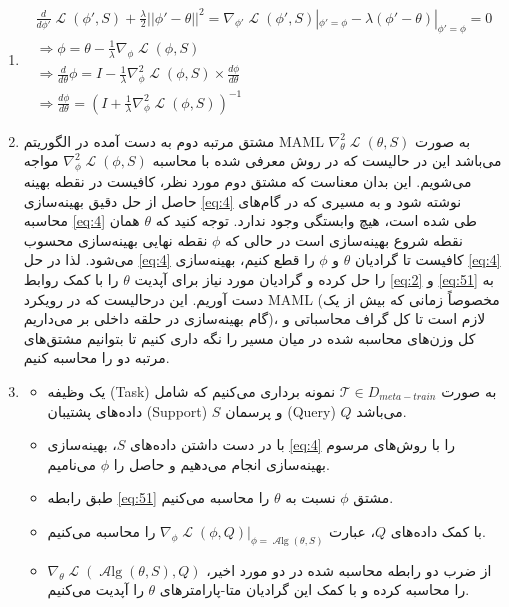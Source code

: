 \documentclass{article}
\DeclareMathOperator{\Loss}{\mathcal{L}}
\DeclareMathOperator{\Alg}{\mathcal{A}lg}
\begin{document}
\begin{enumerate}
\item

\begin{subequations}
	\begin{alignat}{2}
		\frac{d}{d\phi'} \Loss(\phi', S) + \frac{\lambda}{2}||\phi' - \theta||^2 = \nabla_{\phi'} \Loss(\phi', S) |_{\phi' = \phi} - \lambda (\phi'-\theta) |_{\phi' = \phi} = 0 \\ 
		\Rightarrow \phi = \theta - \frac{1}{\lambda} \nabla_\phi \Loss (\phi, S) \\
		\Rightarrow \frac{d}{d\theta} \phi = I - \frac{1}{\lambda} \nabla^2_\phi \Loss (\phi, S) \times \frac{d\phi}{d\theta} \\ 
		\Rightarrow \frac{d\phi}{d\theta} = 
		(I +‌ 
		\frac{1}{\lambda} \nabla^2_\phi \Loss (\phi, S)
		)^{-1} \label{eq:51}
	\end{alignat}
\end{subequations}

\item
مشتق مرتبه دوم به دست آمده در الگوریتم MAML به صورت 
$\nabla^2_\theta \Loss(\theta, S)$
می‌باشد این در حالیست که در روش معرفی شده با محاسبه
$\nabla^2_\phi \Loss(\phi, S)$
مواجه می‌شویم. این بدان معناست که مشتق دوم مورد نظر، کافیست در نقطه بهینه حاصل از حل دقیق بهینه‌سازی
\ref{eq:4}
نوشته شود و به مسیری که در گام‌های محاسبه \ref{eq:4}
طی شده است، هیچ وابستگی وجود ندارد. 
توجه کنید که 
$\theta$
همان نقطه شروع بهینه‌سازی است در حالی که 
$\phi$
نقطه نهایی بهینه‌سازی محسوب می‌شود.
لذا در حل 
\ref{eq:4}
کافیست تا گرادیان 
$\theta$
و
$\phi$
را قطع کنیم، بهینه‌سازی 
\ref{eq:4}
را حل کرده و گرادیان مورد نیاز برای آپدیت 
$\theta$
را با کمک روابط 
\ref{eq:2}
و
\ref{eq:51}
به دست آوریم. این درحالیست که در رویکرد MAML (مخصوصاً‌ زمانی که بیش از یک گام بهینه‌سازی در حلقه داخلی بر می‌داریم)، لازم است تا کل گراف محاسباتی و کل وزن‌های محاسبه شده در میان مسیر را نگه داری کنیم تا بتوانیم مشتق‌های مرتبه دو را محاسبه کنیم. 

\item
\begin{itemize}
\item
یک وظیفه (Task) به صورت 
$\mathcal{T} \in D_{meta-train}$
نمونه برداری می‌کنیم که شامل داده‌های پشتیبان (Support)
$S$
و پرسمان (Query)
$Q$
می‌باشد.
\item
با در دست داشتن داده‌های $S$، بهینه‌سازی \ref{eq:4} 
را با روش‌های مرسوم بهینه‌سازی انجام می‌دهیم و حاصل را $\phi$ می‌نامیم.
\item
طبق رابطه 
\ref{eq:51}
مشتق 
$\phi$
نسبت به 
$\theta$
را محاسبه می‌کنیم.
\item
با کمک داده‌های 
$Q$،
عبارت 
$\nabla_{\phi} \Loss (\phi, Q) |_{\phi = \Alg(\theta, S)} $
را محاسبه می‌کنیم.
\item
از ضرب دو رابطه محاسبه شده در دو مورد اخیر، 
$\nabla_{\theta} \Loss (\Alg(\theta, S), Q)$
را محاسبه کرده و با کمک این گرادیان متا-پارامتر‌های 
$\theta$
را آپدیت می‌کنیم.
\end{itemize}

\end{enumerate}
\fi
\end{document}
